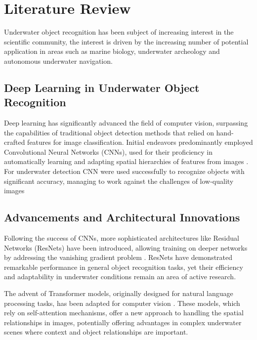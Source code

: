 
\section{Literature Review}
Underwater object recognition has been subject of increasing interest in the
scientific community, the interest is driven by the increasing number of
potential application in areas such as marine biology, underwater archeology
and autonomous underwater navigation.

\subsection{Deep Learning in Underwater Object Recognition}
Deep learning has significantly advanced the field of computer vision,
surpassing the capabilities of traditional object detection methods that
relied on hand-crafted features for image classification.
Initial endeavors predominantly employed Convolutional Neural Networks
(CNNs), used for their proficiency in automatically learning
and adapting spatial hierarchies of features from
images \parencite{zhiqiangReviewObjectDetection2017}.
For underwater detection CNN were used successfully to recognize objects with
significant accuracy, managing to work against the challenges of low-quality
images \parencite{hanUnderwaterImageProcessing2020}

\subsection{Advancements and Architectural Innovations}
Following the success of CNNs, more sophisticated architectures
like Residual Networks (ResNets) have been introduced, allowing training on
deeper networks by addressing the vanishing gradient problem 
\parencite{heDeepResidualLearning2016}.
ResNets have demonstrated remarkable performance in general object recognition
tasks, yet their efficiency and adaptability in underwater conditions remain
an area of active research.

The advent of Transformer models, originally designed for natural
language processing tasks, has been adapted for computer
vision \parencite{hanSurveyVisionTransformer2023}.
These models, which rely on self-attention mechanisms, offer a new
approach to handling the spatial relationships in images,
potentially offering advantages in complex underwater scenes where context
and object relationships are important.

